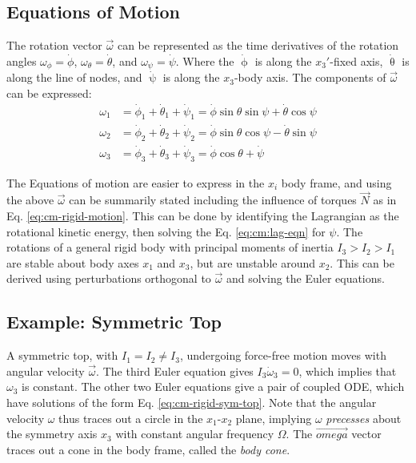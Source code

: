 \subsection{Equations of Motion}
The rotation vector $\vec{\omega}$ can be represented as the time derivatives of the rotation angles $\omega_{\phi} = \dot{\phi}$, $\omega_{\theta} = \dot{\theta}$, and $\omega_{\psi} = \dot{\psi}$. Where the $\dot{\upphi}$ is along the $x_3'$-fixed axis, $\dot{\uptheta}$ is along the line of nodes, and $\dot{\uppsi}$ is along the $x_3$-body axis. The components of $\vec{\omega}$ can be expressed:
\begin{align}
	\omega_1 &= \dot{\phi}_1 + \dot{\theta}_1 + \dot{\psi}_1 = \dot{\phi}\sin{\theta}\sin{\psi} + \dot{\theta}\cos{\psi} \\
	\omega_2 &= \dot{\phi}_2 + \dot{\theta}_2 + \dot{\psi}_2 = \dot{\phi}\sin{\theta}\cos{\psi} - \dot{\theta}\sin{\psi} \\
	\omega_3 &= \dot{\phi}_3 + \dot{\theta}_3 + \dot{\psi}_3 = \dot{\phi}\cos{\theta} + \dot{\psi}
\end{align}

The Equations of motion are easier to express in the $x_i$ body frame, and using the above $\vec{\omega}$ can be summarily stated including the influence of torques $\vec{N}$ as in Eq. \ref{eq:cm-rigid-motion}. This can be done by identifying the Lagrangian as the rotational kinetic energy, then solving the Eq. \ref{eq:cm:lag-eqn} for $\psi$.
The rotations of a general rigid body with principal moments of inertia $I_3 > I_2 > I_1$ are stable about body axes $x_1$ and $x_3$, but are unstable around $x_2$. This can be derived using perturbations orthogonal to $\vec{\omega}$ and solving the Euler equations.

\subsection{Example: Symmetric Top}
A symmetric top, with $I_1 = I_2 \neq I_3$, undergoing force-free motion moves with angular velocity $\vec{\omega}$. The third Euler equation gives $I_3 \dot{\omega}_3 = 0$, which implies that $\omega_3$ is constant. The other two Euler equations give a pair of coupled ODE, which have solutions of the form Eq. \ref{eq:cm-rigid-sym-top}. Note that the angular velocity $\omega$ thus traces out a circle in the $x_1$-$x_2$ plane, implying $\omega$ \textit{precesses} about the symmetry axis $x_3$ with constant angular frequency $\Omega$. The $\vec{omega}$ vector traces out a cone in the body frame, called the \textit{body cone}. 


